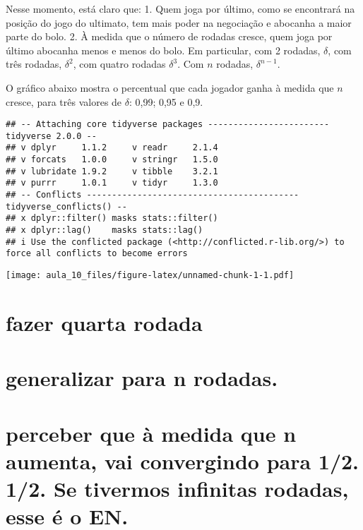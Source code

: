 \documentclass[
]{article}
\begin{document}
Nesse momento, está claro que: 1. Quem joga por último, como se
encontrará na posição do jogo do ultimato, tem mais poder na negociação
e abocanha a maior parte do bolo. 2. À medida que o número de rodadas
cresce, quem joga por último abocanha menos e menos do bolo. Em
particular, com 2 rodadas, \(\delta\), com três rodadas, \(\delta^2\),
com quatro rodadas \(\delta^3\). Com \(n\) rodadas, \(\delta^{n-1}\).

O gráfico abaixo mostra o percentual que cada jogador ganha à medida que
\(n\) cresce, para três valores de \(\delta\): 0,99; 0,95 e 0,9.

\begin{verbatim}
## -- Attaching core tidyverse packages ------------------------ tidyverse 2.0.0 --
## v dplyr     1.1.2     v readr     2.1.4
## v forcats   1.0.0     v stringr   1.5.0
## v lubridate 1.9.2     v tibble    3.2.1
## v purrr     1.0.1     v tidyr     1.3.0
## -- Conflicts ------------------------------------------ tidyverse_conflicts() --
## x dplyr::filter() masks stats::filter()
## x dplyr::lag()    masks stats::lag()
## i Use the conflicted package (<http://conflicted.r-lib.org/>) to force all conflicts to become errors
\end{verbatim}

\texttt{[image: aula\_10\_files/figure-latex/unnamed-chunk-1-1.pdf]}

\hypertarget{fazer-quarta-rodada}{%
\section{fazer quarta rodada}\label{fazer-quarta-rodada}}

\hypertarget{generalizar-para-n-rodadas.}{%
\section{generalizar para n
rodadas.}\label{generalizar-para-n-rodadas.}}

\hypertarget{perceber-que-uxe0-medida-que-n-aumenta-vai-convergindo-para-12.-12.-se-tivermos-infinitas-rodadas-esse-uxe9-o-en.}{%
\section{perceber que à medida que n aumenta, vai convergindo para 1/2.
1/2. Se tivermos infinitas rodadas, esse é o
EN.}\label{perceber-que-uxe0-medida-que-n-aumenta-vai-convergindo-para-12.-12.-se-tivermos-infinitas-rodadas-esse-uxe9-o-en.}}
\end{document}
